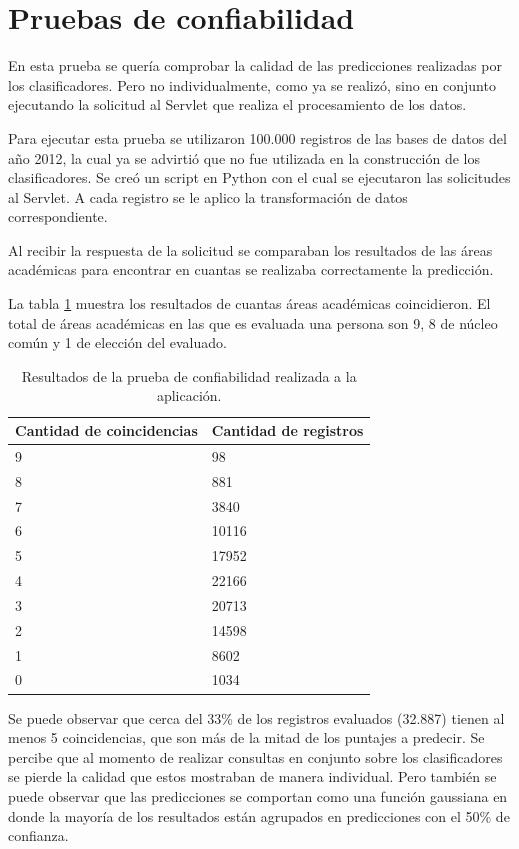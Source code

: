 \section{Pruebas de confiabilidad}
En esta prueba se quería comprobar la calidad de las predicciones realizadas por los clasificadores. Pero no individualmente, como ya se realizó, sino en conjunto ejecutando la solicitud al Servlet que realiza el procesamiento de los datos.

Para ejecutar esta prueba se utilizaron 100.000 registros de las bases de datos del año 2012, la cual ya se advirtió que no fue utilizada en la construcción de los clasificadores. Se creó un script en Python con el cual se ejecutaron las solicitudes al Servlet. A cada registro se le aplico la transformación de datos correspondiente.

Al recibir la respuesta de la solicitud se comparaban los resultados de las áreas académicas para encontrar en cuantas se realizaba correctamente la predicción.

La tabla \ref{tab:cuadro39} muestra los resultados de cuantas áreas académicas coincidieron. El total de áreas académicas en las que es evaluada una persona son 9, 8 de núcleo común y 1 de elección del evaluado.

\begin{table}[!Hhtb]
\centering
\begin{tabular}{|p{6.5cm}|p{6.5cm}|}
\hline
	\rowcolor[gray]{0.9} 
	\textbf{Cantidad de coincidencias} &
	\textbf{Cantidad de registros} 
	\\
\hline
9 & 98\\
\hline
8 & 881\\
\hline
7 & 3840\\
\hline
6 & 10116\\
\hline
5 & 17952\\
\hline
4 & 22166\\
\hline
3 & 20713\\
\hline
2 & 14598\\
\hline
1 & 8602\\
\hline
0 & 1034\\
\hline
\end{tabular}
\caption{Resultados de la prueba de confiabilidad realizada a la aplicación.}
\label{tab:cuadro39}
\end{table}
Se puede observar que cerca del 33\% de los registros evaluados (32.887) tienen al menos 5 coincidencias, que son más de la mitad de los puntajes a predecir. Se percibe que al momento de realizar consultas en conjunto sobre los clasificadores se pierde la calidad que estos mostraban de manera individual. Pero también se puede observar que las predicciones se comportan como una función gaussiana en  donde la mayoría de los resultados están agrupados en predicciones con el 50\% de confianza.